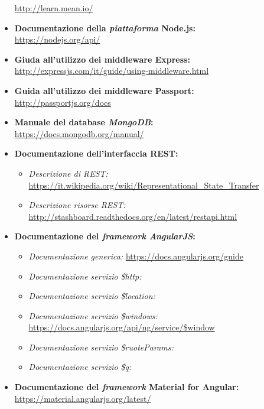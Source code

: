 \begin{itemize}
	\url{http://learn.mean.io/}
	\item \textbf{Documentazione della \textit{piattaforma} Node.js:} \\
	\url{https://nodejs.org/api/}
	\item \textbf{Giuda all'utilizzo dei middleware Express:} \\
	\url{http://expressjs.com/it/guide/using-middleware.html}
	\item \textbf{Guida all'utilizzo dei middleware Passport:} \\
	\url{http://passportjs.org/docs}
	\item \textbf{Manuale del database \textit{MongoDB}:} \\
	\url{https://docs.mongodb.org/manual/}
	\item \textbf{Documentazione dell'interfaccia REST:}
	\begin{itemize}
		\item \textit{Descrizione di REST:} \url{https://it.wikipedia.org/wiki/Representational_State_Transfer}
		\item \textit{Descrizione risorse REST:} \url{http://stashboard.readthedocs.org/en/latest/restapi.html}
	\end{itemize}
	\item \textbf{Documentazione del \textit{framework AngularJS}:} \\
	\begin{itemize}
		\item \textit{Documentazione generica:} \url{https://docs.angularjs.org/guide}
		\item \textit{Documentazione servizio \$http:} 
		\item \textit{Documentazione servizio \$location:} 
		\item \textit{Documentazione servizio \$windows:} \url{https://docs.angularjs.org/api/ng/service/$window}
		\item \textit{Documentazione servizio \$ruoteParams:} 
		\item \textit{Documentazione servizio \$q:} 
		\end{itemize}
		\item \textbf{Documentazione del \textit{framework} Material for Angular:} \\
		\url{https://material.angularjs.org/latest/}

\end{itemize}
